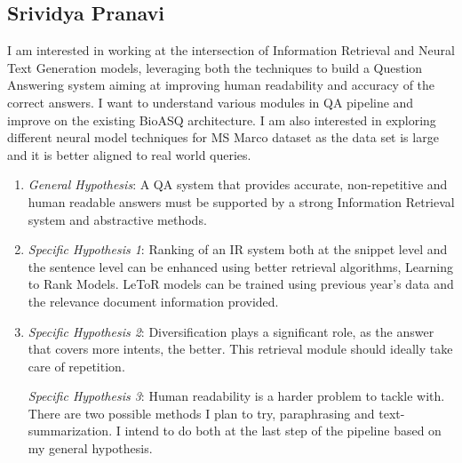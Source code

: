 \documentclass{article}
\begin{document}
\pagebreak

\subsection{Srividya Pranavi}
I am interested in working at the intersection of Information Retrieval and Neural Text Generation models, leveraging both the techniques to build a Question Answering system aiming at improving human readability and accuracy of the correct answers. I want to understand various modules in QA pipeline and improve on the existing BioASQ architecture. I am also interested in exploring different neural model techniques for MS Marco dataset as the data set is large and it is better aligned to real world queries.

\begin{enumerate}
\item[]\textit{General Hypothesis}: A QA system that provides accurate, non-repetitive and human readable answers must be supported by a strong Information Retrieval system and abstractive methods.

\item[]\textit{Specific Hypothesis 1}: Ranking of an IR system both at the snippet level and the sentence level can be enhanced using better retrieval algorithms, Learning to Rank Models. LeToR models can be trained using previous year's data and the relevance document information provided.

\item[]\textit{Specific Hypothesis 2}: Diversification plays a significant role, as the answer that covers more intents, the better. This retrieval module should ideally take care of repetition.

\textit{Specific Hypothesis 3}: Human readability is a harder problem to tackle with. There are two possible methods I plan to try, paraphrasing and text-summarization. I intend to do both at the last step of the pipeline based on my general hypothesis.
\end{enumerate}
\end{document}
